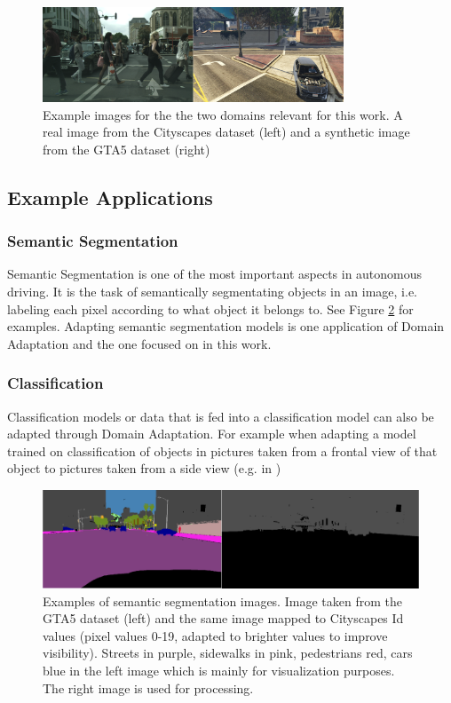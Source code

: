 \begin{figure}
	\centering
	 \includegraphics[width=0.8\textwidth]{../images/DA_examples_cityscapes_gta.png}
	\caption{Example images for the the two domains relevant for this work. A real image from the Cityscapes dataset \cite{Cordts_2016_CVPR} (left) and a synthetic image from the GTA5 dataset \cite{Richter_2016_ECCV} (right)}
	\label{fig:DA_examples}
\end{figure}

\subsection{Example Applications}
\subsubsection{Semantic Segmentation}
Semantic Segmentation is one of the most important aspects in autonomous driving. It is the task of semantically segmentating objects in an image, i.e. labeling each pixel according to what object it belongs to. See Figure \ref{fig:semseg} for examples. Adapting semantic segmentation models is one application of Domain Adaptation and the one focused on in this work. 

\subsubsection{Classification}
Classification models or data that is fed into a classification model can also be adapted through Domain Adaptation. For example when adapting a model trained on classification of objects in pictures taken from a frontal view of that object to pictures taken from a side view (e.g. in \cite{10.1007/978-3-642-15561-1_16})

\begin{figure}
	\centering
	\includegraphics[width=\textwidth]{../images/semseg.png}
	\caption{Examples of semantic segmentation images. Image taken from the GTA5 dataset \cite{Richter_2016_ECCV} (left) and the same image mapped to Cityscapes Id values (pixel values 0-19, adapted to brighter values to improve visibility). Streets in purple, sidewalks in pink, pedestrians red, cars blue in the left image which is mainly for visualization purposes. The right image is used for processing.}
	\label{fig:semseg}
\end{figure}



